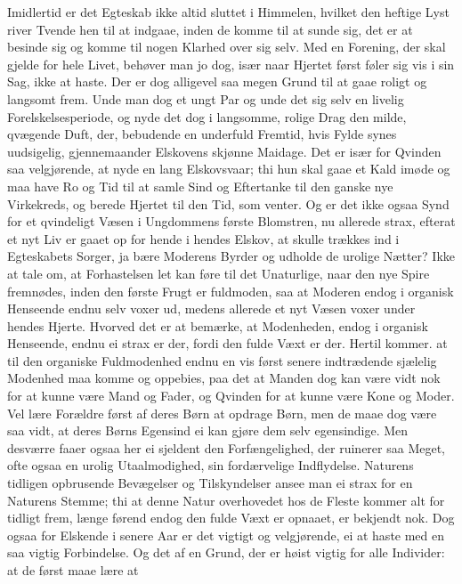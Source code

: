 \documentclass[12pt,a4paper]{book}
\newcommand{\apage}[1]{\marginnote{\footnotesize\textit{[#1]}}}
\begin{document}
Imidlertid er det Egteskab ikke altid sluttet i Himmelen, hvilket den
heftige Lyst river Tvende hen til at indgaae, inden de komme til at
sunde sig, det er at besinde sig og komme til nogen Klarhed over sig
selv. Med en Forening, der skal gjelde for hele Livet, behøver man jo
dog, især naar Hjertet først føler sig vis i sin Sag, ikke at haste. Der
er dog alligevel saa megen Grund til at gaae roligt og langsomt frem.
Unde man dog et ungt Par og unde det sig selv en livelig
Forelskelsesperiode, og nyde det dog i langsomme, rolige Drag den milde,
qvægende Duft, der, bebudende en underfuld Fremtid, hvis Fylde synes
uudsigelig, gjennemaander Elskovens skjønne Maidage. Det er især for
Qvinden saa velgjørende, at nyde en lang Elskovsvaar; thi hun skal gaae
et Kald imøde og maa have Ro og Tid til at samle Sind og Eftertanke til
den ganske nye Virkekreds, og berede Hjertet til den Tid, som venter. Og
er det ikke ogsaa Synd for et qvindeligt Væsen i Ungdommens første
Blomstren, nu allerede strax, efterat et nyt Liv er gaaet op for hende i
hendes Elskov, at skulle trækkes ind i Egteskabets Sorger, ja \apage{79} bære
Moderens Byrder og udholde de urolige Nætter? Ikke at tale om, at
Forhastelsen let kan føre til det Unaturlige, naar den nye Spire
fremnødes, inden den første Frugt er fuldmoden, saa at Moderen endog i
organisk Henseende endnu selv voxer ud, medens allerede et nyt Væsen
voxer under hendes Hjerte. Hvorved det er at bemærke, at Modenheden,
endog i organisk Henseende, endnu ei strax er der, fordi den fulde Væxt
er der. Hertil kommer. at til den organiske Fuldmodenhed endnu en vis
først senere indtrædende sjælelig Modenhed maa komme og oppebies, paa
det at Manden dog kan være vidt nok for at kunne være Mand og Fader, og
Qvinden for at kunne være Kone og Moder. Vel lære Forældre først af
deres Børn at opdrage Børn, men de maae dog være saa vidt, at deres
Børns Egensind ei kan gjøre dem selv egensindige. Men desværre faaer
ogsaa her ei sjeldent den Forfængelighed, der ruinerer saa Meget, ofte
ogsaa en urolig Utaalmodighed, sin fordærvelige Indflydelse. Naturens
tidligen opbrusende Bevægelser og Tilskyndelser ansee man ei strax for
en Naturens Stemme; thi at denne Natur overhovedet hos de Fleste kommer
alt for tidligt frem, længe førend endog den fulde Væxt er opnaaet, er
bekjendt nok. Dog ogsaa for Elskende i senere Aar er det vigtigt og
velgjørende, ei at haste med en saa vigtig Forbindelse. Og det af en
Grund, der er høist vigtig for alle Individer: at de først maae lære at
\end{document}
